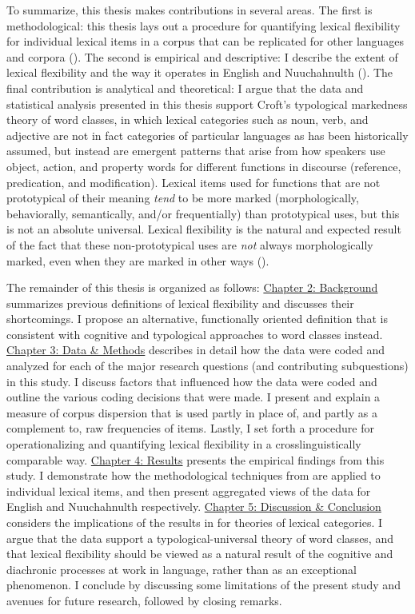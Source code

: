 To summarize, this thesis makes contributions in several areas. The first is methodological: this thesis lays out a procedure for quantifying lexical flexibility for individual lexical items in a corpus that can be replicated for other languages and corpora (). The second is empirical and descriptive: I describe the extent of lexical flexibility and the way it operates in English and Nuuchahnulth (). The final contribution is analytical and theoretical: I argue that the data and statistical analysis presented in this thesis support Croft's typological markedness theory of word classes, in which lexical categories such as noun, verb, and adjective are not in fact categories of particular languages as has been historically assumed, but instead are emergent patterns that arise from how speakers use object, action, and property words for different functions in discourse (reference, predication, and modification). Lexical items used for functions that are not prototypical of their meaning \emph{tend} to be more marked (morphologically, behaviorally, semantically, and/or frequentially) than prototypical uses, but this is not an absolute universal. Lexical flexibility is the natural and expected result of the fact that these non-prototypical uses are \emph{not} always morphologically marked, even when they are marked in other ways ().

The remainder of this thesis is organized as follows: \hyperref[ch:background]{Chapter 2: Background} summarizes previous definitions of lexical flexibility and discusses their shortcomings. I propose an alternative, functionally oriented definition that is consistent with cognitive and typological approaches to word classes instead. \hyperref[ch:background]{Chapter 3: Data \& Methods} describes in detail how the data were coded and analyzed for each of the major research questions (and contributing subquestions) in this study. I discuss factors that influenced how the data were coded and outline the various coding decisions that were made. I present and explain a measure of corpus dispersion that is used partly in place of, and partly as a complement to, raw frequencies of items. Lastly, I set forth a procedure for operationalizing and quantifying lexical flexibility in a crosslinguistically comparable way. \hyperref[ch:background]{Chapter 4: Results} presents the empirical findings from this study. I demonstrate how the methodological techniques from  are applied to individual lexical items, and then present aggregated views of the data for English and Nuuchahnulth respectively. \hyperref[ch:background]{Chapter 5: Discussion \& Conclusion} considers the implications of the results in  for theories of lexical categories. I argue that the data support a typological-universal theory of word classes, and that lexical flexibility should be viewed as a natural result of the cognitive and diachronic processes at work in language, rather than as an exceptional phenomenon. I conclude by discussing some limitations of the present study and avenues for future research, followed by closing remarks.
